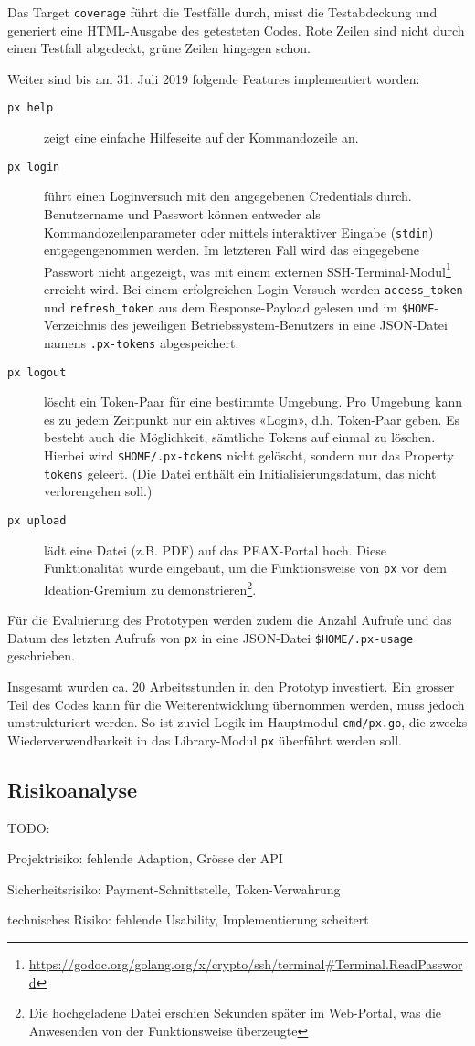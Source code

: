 Das Target \texttt{coverage} führt die Testfälle durch, misst die Testabdeckung und generiert eine HTML-Ausgabe des getesteten Codes. Rote Zeilen sind nicht durch einen Testfall abgedeckt, grüne Zeilen hingegen schon. \cite[Kapitel 11.3]{gopl}

Weiter sind bis am 31. Juli 2019 folgende Features implementiert worden:

\begin{description}
	\item[\texttt{px help}] zeigt eine einfache Hilfeseite auf der Kommandozeile an.
    \item[\texttt{px login}] führt einen Loginversuch mit den angegebenen Credentials durch. Benutzername und Passwort können entweder als Kommandozeilenparameter oder mittels interaktiver Eingabe (\texttt{stdin}) entgegengenommen werden. Im letzteren Fall wird das eingegebene Passwort nicht angezeigt, was mit einem externen SSH-Ter\-mi\-nal-Modul\footnote{\url{https://godoc.org/golang.org/x/crypto/ssh/terminal\#Terminal.ReadPassword}} erreicht wird. Bei einem erfolgreichen Login-Versuch werden \texttt{access\_token} und \texttt{refresh\_token} aus dem Response-Payload gelesen und im \texttt{\$HOME}-Verzeichnis des jeweiligen Betriebssystem-Benutzers in eine JSON-Datei namens \texttt{.px-tokens} abgespeichert.
	\item[\texttt{px logout}] löscht ein Token-Paar für eine bestimmte Umgebung. Pro Umgebung kann es zu jedem Zeitpunkt nur ein aktives «Login», d.h. Token-Paar geben. Es besteht auch die Möglichkeit, sämtliche Tokens auf einmal zu löschen. Hierbei wird \texttt{\$HOME/.px-tokens} nicht gelöscht, sondern nur das Property \texttt{tokens} geleert. (Die Datei enthält ein Initialisierungsdatum, das nicht verlorengehen soll.)
	\item[\texttt{px upload}] lädt eine Datei (z.B. PDF) auf das PEAX-Portal hoch. Diese Funktionalität wurde eingebaut, um die Funktionsweise von \texttt{px} vor dem Ideation-Gremium zu demonstrieren\footnote{Die hochgeladene Datei erschien Sekunden später im Web-Portal, was die Anwesenden von der Funktionsweise überzeugte}.
\end{description}

Für die Evaluierung des Prototypen werden zudem die Anzahl Aufrufe und das Datum des letzten Aufrufs von \texttt{px} in eine JSON-Datei \texttt{\$HOME/.px-usage} geschrieben.

Insgesamt wurden ca. 20 Arbeitsstunden in den Prototyp investiert. Ein grosser Teil des Codes kann für die Weiterentwicklung übernommen werden, muss jedoch umstrukturiert werden. So ist zuviel Logik im Hauptmodul \texttt{cmd/px.go}, die zwecks Wiederverwendbarkeit in das Library-Modul \texttt{px} überführt werden soll.

\subsection{Risikoanalyse}

TODO:

Projektrisiko: fehlende Adaption, Grösse der API

Sicherheitsrisiko: Payment-Schnittstelle, Token-Verwahrung

technisches Risiko: fehlende Usability, Implementierung scheitert
